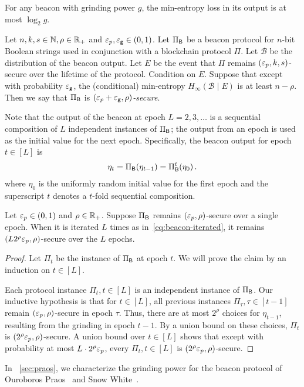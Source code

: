 \begin{fact}\label{fact:min-entropy-grinding-power}
  For any beacon with grinding power $g$, 
  the min-entropy loss in its output is at most $\log_2 g$.
\end{fact}

\begin{definition}\label{def:beacon-security}
    Let $n,k,s \in \mathbb{N}, \rho \in \mathbb{R}_+$ and $\mathsf{\varepsilon}_p, \mathsf{\varepsilon_g} \in (0,1)$.
    Let $\Pi_{\mathsf{B}}$ be a beacon protocol for $n$-bit Boolean strings 
    used in conjunction with a blockchain protocol $\Pi$. 
    Let $\mathcal{B}$ be the distribution of the beacon output.
    Let $E$ be the event that $\Pi$ remains $(\mathsf{\varepsilon}_p, k, s)$-secure over the lifetime of the protocol. 
    Condition on $E$. 
    Suppose that except with probability $\mathsf{\varepsilon_g}$, 
    the (conditional) min-entropy 
    $H_\infty(\mathcal{B} \mid E)$ is at least $n - \rho$. 
    Then we say that $\Pi_{\mathsf{B}}$ is \emph{$(\mathsf{\varepsilon}_p + \mathsf{\varepsilon_g}, \rho)$-secure}.
\end{definition}



Note that the output of the beacon at epoch $L = 2, 3, \ldots$  
is a sequential composition of $L$ independent instances of $\Pi_{\mathsf{B}}$; 
the output from an epoch is used as the initial value for the next epoch. 
Specifically, 
the beacon output for epoch $t \in [L]$ is 
\begin{align}\label{eq:beacon-iterated}
    \eta_t = \Pi_{\mathsf{B}}(\eta_{t-1}) = \Pi_{\mathsf{B}}^t(\eta_0)\,.
\end{align}
where $\eta_0$ is the uniformly random initial value for the first epoch 
and the superscript $t$ denotes a $t$-fold sequential composition.


\begin{lemma}\label{lemma:beacon-composition}
Let $\mathsf{\varepsilon}_p \in (0,1)$ and $\rho \in \mathbb{R}_+$.
Suppose $\Pi_{\mathsf{B}}$ remains $(\mathsf{\varepsilon}_p, \rho)$-secure over a single epoch. 
When it is iterated $L$ times as in~\eqref{eq:beacon-iterated}, 
it remains $\left(L 2^\rho \mathsf{\varepsilon}_p, \rho\right)$-secure 
over the $L$ epochs.
\end{lemma}
\begin{proof}
    Let $\Pi_t$ be the instance of $\Pi_{\mathsf{B}}$ at epoch $t$. 
    We will prove the claim by an induction on $t \in [L]$. 

    Each protocol instance $\Pi_t, t \in [L]$ 
    is an independent instance of $\Pi_{\mathsf{B}}$. 
    Our inductive hypothesis is that for $t \in [L]$, 
    all previous instances 
    $\Pi_\tau, \tau \in [t-1]$ remain $(\mathsf{\varepsilon}_p, \rho)$-secure in epoch $\tau$. 
    Thus, there are at most $2^\rho$ choices for $\eta_{t - 1}$, 
    resulting from the grinding in epoch $t-1$.
    By a union bound on these choices, $\Pi_t$ is $(2^\rho \mathsf{\varepsilon}_p, \rho)$-secure. 
    A union bound over $t \in [L]$ shows that 
    except with probability at most $L\cdot 2^\rho \mathsf{\varepsilon}_p$, 
    every $\Pi_t, t \in [L]$ is $(2^\rho \mathsf{\varepsilon}_p, \rho)$-secure.
\end{proof}


In \Section~\ref{sec:praos}, we characterize the grinding power 
for the beacon protocol of Ouroboros Praos~\cite{Praos} and Snow White~\cite{SnowWhite}.





